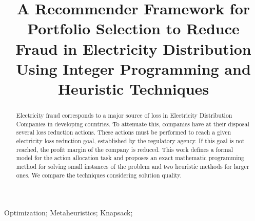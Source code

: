 \documentclass[10pt, conference, compsocconf]{IEEEtran}
\renewcommand*{\nameyeardelim}{\addspace}
\renewcommand*{\revsdnamedelim}{\addspace}
\begin{document}
\renewcommand*{\nameyeardelim}{\addspace}
\renewcommand*{\revsdnamedelim}{\addspace}
%
\title{A Recommender Framework for Portfolio Selection to Reduce
Fraud in Electricity Distribution Using Integer Programming and Heuristic Techniques}




\author{
}



\maketitle


\begin{abstract}
Electricity fraud corresponds to a major source of loss in Electricity
Distribution Companies in developing countries. To attenuate this,
companies have at their disposal several loss reduction actions. These actions
must be performed to reach a given electricity loss reduction goal, established
by the regulatory agency. If this goal is not reached, the profit margin
of the company is reduced.
This work defines a formal model for the action allocation task 
and proposes an exact mathematic programming method for solving small instances of
the problem and two heuristic methods for larger ones. We compare
the techniques considering solution quality.

\end{abstract}

\begin{IEEEkeywords}
Optimization; Metaheuristics; Knapsack;
\end{IEEEkeywords}


%
\IEEEpeerreviewmaketitle







% 







\printbibliography

\end{document}
